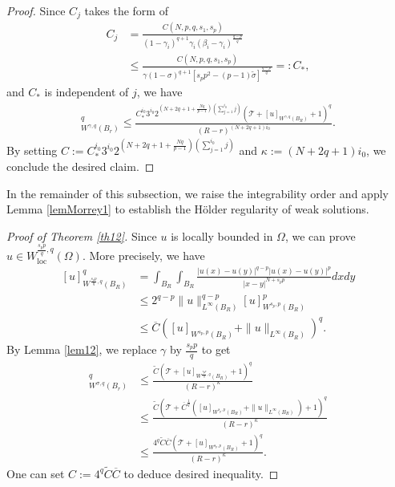 \documentclass[reqno,10pt]{amsart}
\numberwithin{equation}{section}
\begin{document}
\begin{proof}
	Since $C_j$ takes the form of 
	\begin{align*}
		C_j&=\frac{C\left(N, p, q, s_1, s_p\right)}{(1-\gamma_i)^{q+1}\gamma_i(\beta_i-\gamma_i)^{\frac{q-p}{q}}}\\
		& \le \frac{C\left(N, p, q, s_1, s_p\right)}{\gamma \left(1-\sigma\right)^{q+1}[s_pp^2-(p-1)\tilde{\sigma}]^{\frac{q-p}{q}}}=:C_*,
	\end{align*}
	and $C_*$ is independent of $j$, we have 
	\begin{align*}
		[u]_{W^{\gamma, q}\left(B_r\right)}^q \leq \frac{C_*^{i_0}  3^{i_0} 2^{\left(N+2q+1+\frac{Nq}{p-1}\right)\left(\sum\limits_{j=1}^{i_0} j\right)}\left(\mathcal{T}+[u]_{W^{\gamma,q}\left(B_R\right)}+1\right)^q}{(R-r)^{(N+2q+1)i_0}}.
	\end{align*}
	By setting $C:=C_*^{i_0}  3^{i_0}  2^{\left(N+2q+1+\frac{Nq}{p-1}\right)\left(\sum\limits_{j=1}^{i_0} j\right)}$ and $\kappa:=(N+2q+1) i_0$, we conclude the desired claim.
\end{proof}

In the remainder of this subsection, we raise the integrability order and apply Lemma \ref{lemMorrey1} to establish the H\"{o}lder regularity of weak solutions.

\begin{proof}[Proof of Theorem \ref{th12}]
	Since $u$ is locally bounded in $\Omega$, we can prove $u\in W^{\frac{s_pp}{q},q}_{\mathrm{loc}}(\Omega)$. More precisely, we have 
	\begin{align}\label{13.1}
		[u]_{W^{\frac{s_p p}{q}, q}\left(B_R\right)}^q  & = \int_{B_R} \int_{B_R} \frac{|u(x)-u(y)|^{q-p}|u(x)-u(y)|^p}{|x-y|^{N+s_p p}} d x d y \nonumber\\
		& \leq 2^{q-p}\|u\|_{L^{\infty}\left(B_R\right)}^{q-p}[u]_{W^{s_p, p}\left(B_R\right)}^p \nonumber\\
		& \leq \overline{C}\left( [u]_{W^{s_p, p}\left(B_R\right)}+\|u\|_{L^{\infty}\left(B_R\right)}\right)^q .
	\end{align}
	By Lemma \ref{lem12}, we replace $\gamma$ by $\frac{s_pp}{q}$ to get 
	\begin{align*}
		[u]_{W^{\sigma, q}\left(B_r\right)}^q &\le \frac{\widetilde{C}\left(\mathcal{T}+[u]_{W^{\frac{s _pp}{q},q}\left(B_R\right)}+1\right)^q}{(R-r)^{\kappa} } \\
		& \le \frac{\widetilde{C}\left(\mathcal{T}+\overline{C}^{\frac{1}{q}}\left([u]_{W^{s_p,p}\left(B_R\right)}+\|u\|_{L^{\infty}\left(B_R\right)}\right)+1\right)^q}{(R-r)^{\kappa}} \\
		& \le \frac{4^q \widetilde{C} \overline{C}\left(\mathcal{T}+[u]_{W^{s_p,p}\left(B_R\right)}+1\right)^q}{(R-r)^{\kappa} } .
	\end{align*}
	One can set $C:=4^q \widetilde{C} \overline{C}$ to deduce desired inequality.
\end{proof}
\end{document}
